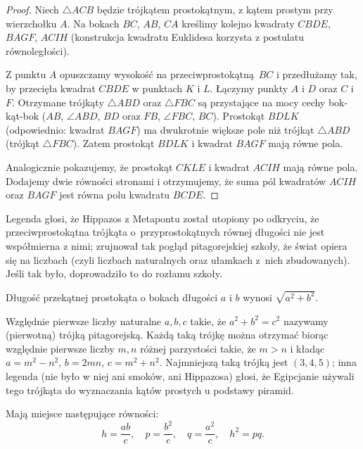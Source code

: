 \begin{proof}
    Niech $\triangle ACB$ będzie trójkątem prostokątnym, z kątem prostym przy wierzchołku $A$.
    Na bokach $BC$, $AB$, $CA$ kreślimy kolejno kwadraty $CBDE$, $BAGF$, $ACIH$ (konstrukcja kwadratu Euklidesa korzysta z postulatu równoległości).

    \begin{figure}
    \end{figure}
    Z punktu $A$ opuszczamy wysokość na przeciwprostokątną $BC$ i przedłużamy tak, by przecięła kwadrat $CBDE$ w punktach $K$ i $L$.
    Łączymy punkty $A$ i $D$ oraz $C$ i $F$.
    Otrzymane trójkąty $\triangle ABD$ oraz $\triangle FBC$ są przystające na mocy cechy bok-kąt-bok ($AB$, $\angle ABD$, $BD$ oraz $FB$, $\angle FBC$, $BC$).
    Prostokąt $BDLK$ (odpowiednio: kwadrat $BAGF$) ma dwukrotnie większe pole niż trójkąt $\triangle ABD$ (trójkąt $\triangle FBC$).
    Zatem prostokąt $BDLK$ i kwadrat $BAGF$ mają równe pola.
    
    Analogicznie pokazujemy, że prostokąt $CKLE$ i kwadrat $ACIH$ mają równe pola.
    Dodajemy dwie równości stronami i otrzymujemy, że suma pól kwadratów $ACIH$ oraz $BAGF$ jest równa polu kwadratu $BCDE$.
\end{proof}

Legenda głosi, że Hippazos z Metapontu został utopiony po odkryciu, że przeciwprostokątna trójkąta o~przyprostokątnych równej długości nie jest współmierna z nimi; zrujnował tak pogląd pitagorejskiej szkoły, że świat opiera się na liczbach (czyli liczbach naturalnych oraz ułamkach z~nich zbudowanych).
Jeśli tak było, doprowadziło to do rozłamu szkoły.

\begin{corollary}
    Długość przekątnej prostokąta o bokach długości $a$ i $b$ wynosi $\sqrt{a^2 + b^2}$.
\end{corollary}

Względnie pierwsze liczby naturalne $a, b, c$ takie, że $a^2 + b^2 = c^2$ nazywamy (pierwotną) trójką pitagorejską.
Każdą taką trójkę można otrzymać biorąc względnie pierwsze liczby $m, n$ różnej parzystości takie, że $m > n$ i kładąc $a = m^2 - n^2$, $b = 2 mn$, $c = m^2 + n^2$.
Najmniejszą taką trójką jest $(3, 4, 5)$; inna legenda (nie było w niej ani smoków, ani Hippazosa) głosi, że Egipcjanie używali tego trójkąta do wyznaczania kątów prostych u podstawy piramid.

\begin{proposition}
    Mają miejsce następujące równości:
    \begin{equation}
        h = \frac{ab}{c}, \quad
        p = \frac{b^2}{c}, \quad
        q = \frac{a^2}{c}, \quad
        h^2 = pq.
    \end{equation}
\end{proposition}

